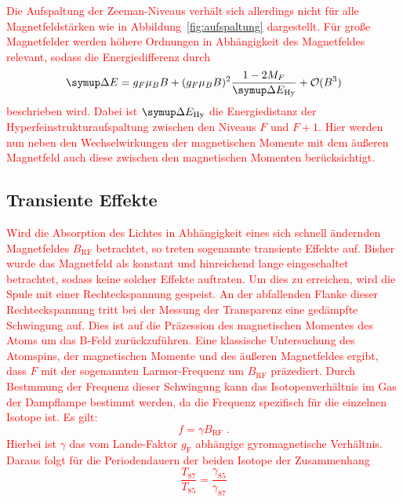 \textcolor{red}{Die Aufspaltung der Zeeman-Niveaus verhält sich allerdings nicht für alle Magnetfeldstärken wie in Abbildung~\ref{fig:aufspaltung} dargestellt. Für große Magnetfelder werden höhere Ordnungen in Abhängigkeit des Magnetfeldes relevant, sodass die Energiedifferenz durch
%
\begin{equation}
  \upD E = g_F\mu_BB + (g_F\mu_BB)^2\frac{1-2M_F}{\upD E_\text{Hy}} + \mathcal{O}(B^3)
  \label{eq:quad_zeeman}
\end{equation}
%
beschrieben wird. Dabei ist $\upD E_\text{Hy}$ die Energiedistanz der Hyperfeinstrukturaufspaltung zwischen den Niveaus $F$ und $F+1$. Hier werden nun neben den Wechselwirkungen der magnetischen Momente mit dem äußeren Magnetfeld auch diese zwischen den magnetischen Momenten berücksichtigt.}

\subsection{Transiente Effekte}

\textcolor{red}{Wird die Absorption des Lichtes in Abhängigkeit eines sich schnell ändernden Magnetfeldes $B_\text{RF}$ betrachtet, so treten sogenannte transiente Effekte auf. Bisher wurde das Magnetfeld als konstant und hinreichend lange eingeschaltet betrachtet, sodass keine solcher Effekte auftraten. Um dies zu erreichen, wird die Spule mit einer Rechteckspannung gespeist. An der abfallenden Flanke dieser Rechteckspannung tritt bei der Messung der Transparenz eine gedämpfte Schwingung auf. Dies ist auf die Präzession des magnetischen Momentes des Atoms um das B-Feld zurückzuführen. Eine klassische Untersuchung des Atomspins, der magnetischen Momente und des äußeren Magnetfeldes ergibt, dass $F$ mit der sogenannten Larmor-Frequenz um $B_\text{RF}$ präzediert. Durch Bestmmung der Frequenz dieser Schwingung kann das Isotopenverhältnis im Gas der Dampflampe bestimmt werden, da die Frequenz spezifisch für die einzelnen Isotope ist. Es gilt:
%
\begin{equation}
  f=\gamma B_\text{RF} \; .
\end{equation}
%
Hierbei ist $\gamma$ das vom Lande-Faktor $g_\text{F}$ abhängige gyromagnetische Verhältnis. Daraus folgt für die Periodendauern der beiden Isotope der Zusammenhang
%
\begin{equation}
  \frac{T_{87}}{T_{85}}=\frac{\gamma_{85}}{\gamma_{87}}
\end{equation}}
